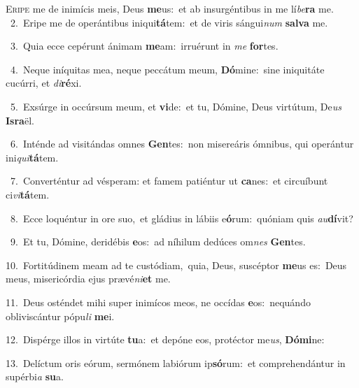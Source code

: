 \lettrine{\initial\textcolor{\initialcolor}{E}}{ripe} me de inimícis meis, Deus \textbf{me}\-us:~\star et ab insurgéntibus in me lí\-\textit{be}\-\textbf{ra} me.\\
{\numbfont\textcolor{\numbcolor}{~2.}}~Eripe me de operántibus iniqui\-\textbf{tá}\-tem:~\star et de viris sángui\textit{num} \textbf{sal}\-\textbf{va} me.\par
{\numbfont\textcolor{\numbcolor}{~3.}}~Quia ecce cepérunt ánimam \textbf{me}\-am:~\star irruérunt in \textit{me} \textbf{for}\-tes.\par
{\numbfont\textcolor{\numbcolor}{~4.}}~Neque iníquitas mea, neque peccátum meum, \textbf{Dó}\-mine:~\star sine iniquitáte cucúrri, et \textit{di}\-\textbf{ré}xi.\par
{\numbfont\textcolor{\numbcolor}{~5.}}~Exsúrge in occúrsum meum, et \textbf{vi}\-de:~\star et tu, Dómine, Deus virtútum, De\textit{us} \textbf{Is}\-\textbf{ra}ël.\par
{\numbfont\textcolor{\numbcolor}{~6.}}~Inténde ad visitándas omnes \textbf{Gen}\-tes:~\star non misereáris ómnibus, qui operántur ini\-\textit{qui}\-\textbf{tá}tem.\par
{\numbfont\textcolor{\numbcolor}{~7.}}~Converténtur ad vésperam: et famem patiéntur ut \textbf{ca}\-nes:~\star et circuíbunt ci\-\textit{vi}\-\textbf{tá}tem.\par
{\numbfont\textcolor{\numbcolor}{~8.}}~Ecce loquéntur in ore suo,~\dagger et gládius in lábiis e\-\textbf{ó}\-rum:~\star quóniam quis \textit{au}\-\textbf{dí}vit?\par
{\numbfont\textcolor{\numbcolor}{~9.}}~Et tu, Dómine, deridébis \textbf{e}\-os:~\star ad níhilum dedúces om\textit{nes} \textbf{Gen}\-tes.\par
{\numbfont\textcolor{\numbcolor}{10.}}~Fortitúdinem meam ad te custódiam,~\dagger quia, Deus, suscéptor \textbf{me}\-us es:~\star Deus meus, misericórdia ejus prævé\-\textit{ni}\-\textbf{et} me.\par
{\numbfont\textcolor{\numbcolor}{11.}}~Deus osténdet mihi super inimícos meos, ne occídas \textbf{e}\-os:~\star nequándo obliviscántur pópu\textit{li} \textbf{me}\-i.\par
{\numbfont\textcolor{\numbcolor}{12.}}~Dispérge illos in virtúte \textbf{tu}\-a:~\star et depóne eos, protéctor me\-\textit{us}\-, \textbf{Dó}\-\textbf{mi}ne:\par
{\numbfont\textcolor{\numbcolor}{13.}}~Delíctum oris eórum, sermónem labiórum ip\-\textbf{só}\-rum:~\star et comprehendántur in supérbi\textit{a} \textbf{su}\-a.\par
